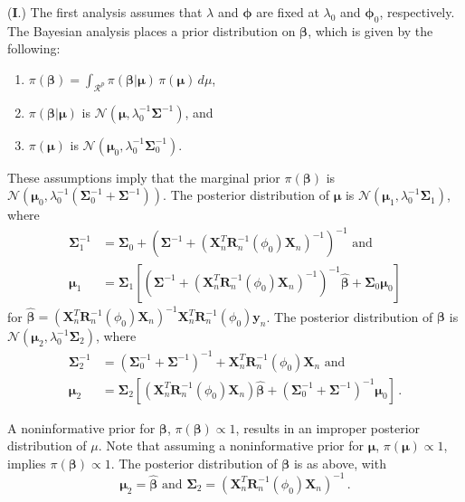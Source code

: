 \documentclass[11pt, oneside]{article}   	%
\begin{document}
({\bf I}.)  The first analysis assumes that $\lambda$ and $\mathbf{\phi}$ are fixed at $\lambda_0$ and $\mathbf{\phi}_0$, respectively.  The Bayesian analysis places a prior distribution on $\mathbf{\beta}$, which is given by the following:
\begin{enumerate}
\item $\pi(\mathbf{\beta}) = \int_{\mathcal{R}^p} \pi(\mathbf{\beta} | \mathbf{\mu}) \, \pi(\mathbf{\mu}) \, d\mu$,
\item $\pi(\mathbf{\beta} | \mathbf{\mu})$ is $\mathcal{N}( \mathbf{\mu}, \lambda_0^{-1} \mathbf{\Sigma}^{-1} )$, and
\item $\pi(\mathbf{\mu})$ is $\mathcal{N}( \mathbf{\mu}_0, \lambda_0^{-1} \mathbf{\Sigma}_0^{-1} )$.
\end{enumerate}
These assumptions imply that the marginal prior $\pi(\mathbf{\beta})$ is $\mathcal{N} \left( \mathbf{\mu}_0, \lambda_0^{-1} \left( \mathbf{\Sigma}_0^{-1}+\mathbf{\Sigma}^{-1} \right) \right)$.  The posterior distribution of $\mathbf{\mu}$ is $\mathcal{N} \left( \mathbf{\mu}_1, \lambda_0^{-1} \mathbf{\Sigma}_1 \right)$, where
\begin{align*}
\mathbf{\Sigma}_1^{-1} &= \mathbf{\Sigma}_0 + \left( \mathbf{\Sigma}^{-1} + \left( \mathbf{X}_n^T \mathbf{R}_n^{-1} (\phi_0) \mathbf{X}_n \right)^{-1} \right)^{-1} \mbox{ and} \\[1ex]
\mathbf{\mu}_1 & = \mathbf{\Sigma}_1 \left[ \left( \mathbf{\Sigma}^{-1} +\left(\mathbf{X}_n^T \mathbf{R}_n^{-1} (\phi_0) \mathbf{X}_n \right)^{-1} \right)^{-1} \hat{\mathbf{\beta}} + \mathbf{\Sigma}_0 \mathbf{\mu}_0 \right]
\end{align*}
for $\hat{\mathbf{\beta}} = \left( \mathbf{X}_n^T \mathbf{R}_n^{-1} (\phi_0) \mathbf{X}_n \right)^{-1} \mathbf{X}_n^T \mathbf{R}_n^{-1} (\phi_0) \mathbf{y}_n$.  The posterior distribution of $\mathbf{\beta}$ is $\mathcal{N} \left( \mathbf{\mu}_2, \lambda_0^{-1} \mathbf{\Sigma}_2 \right)$, where
\begin{align*}
\mathbf{\Sigma}_2^{-1} &= \left(\mathbf{\Sigma}_0^{-1} + \mathbf{\Sigma}^{-1}\right)^{-1} + \mathbf{X}_n^T \mathbf{R}_n^{-1} (\phi_0) \mathbf{X}_n \mbox{ and} \\[1ex]
\mathbf{\mu}_2 & = \mathbf{\Sigma}_2 \left[ (\mathbf{X}_n^T \mathbf{R}_n^{-1} (\phi_0) \mathbf{X}_n) \hat{\mathbf{\beta}} + \left(\mathbf{\Sigma}_0^{-1} + \mathbf{\Sigma}^{-1} \right)^{-1} \mathbf{\mu}_0 \right] \,.
\end{align*}

A noninformative prior for $\mathbf{\beta}$, $\pi(\mathbf{\beta}) \propto 1$, results in an improper posterior distribution of $\mu$.  Note that assuming a noninformative prior for $\mathbf{\mu}$, $\pi(\mathbf{\mu}) \propto 1$, implies $\pi(\mathbf{\beta}) \propto 1$.  The posterior distribution of $\mathbf{\beta}$ is as above, with
\begin{equation}
\mathbf{\mu}_2 = \hat{\mathbf{\beta}} \mbox{ and } \mathbf{\Sigma}_2 = \left( \mathbf{X}_n^T \mathbf{R}_n^{-1} (\phi_0) \mathbf{X}_n \right)^{-1} \,.
\label{eq1}
\end{equation}
\end{document}
